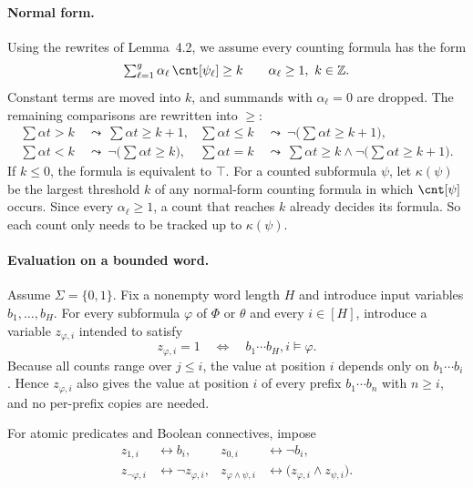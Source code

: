 \paragraph{Normal form.}
Using the rewrites of Lemma~4.2, we assume every counting formula has the form
\[
  \textstyle\sum_{\ell=1}^{g}\alpha_\ell\,\cnt[\psi_\ell] \geq k
  \qquad \alpha_\ell\geq 1,\ k\in\mathbb{Z}.
\]
Constant terms are moved into $k$, and summands with $\alpha_\ell=0$ are dropped. The remaining
comparisons are rewritten into $\geq$:
\begin{align*}
  \textstyle\sum\alpha t > k &\ \leadsto\ \textstyle\sum\alpha t\geq k+1, &
  \textstyle\sum\alpha t \leq k &\ \leadsto\ \lnot\bigl(\textstyle\sum\alpha t\geq k+1\bigr),\\
  \textstyle\sum\alpha t < k &\ \leadsto\ \lnot\bigl(\textstyle\sum\alpha t\geq k\bigr), &
  \textstyle\sum\alpha t = k &\ \leadsto\ \textstyle\sum\alpha t\geq k \land \lnot\bigl(\textstyle\sum\alpha t\geq k+1\bigr).
\end{align*}
If $k\leq 0$, the formula is equivalent to $\top$.
For a counted subformula $\psi$, let $\kappa(\psi)$ be the largest threshold $k$ of any normal-form
counting formula in which $\cnt[\psi]$ occurs. Since every $\alpha_\ell\geq 1$, a count that reaches
$k$ already decides its formula. So each count only needs to be tracked up to $\kappa(\psi)$.

\paragraph{Evaluation on a bounded word.}
Assume $\Sigma=\{0,1\}$. Fix a nonempty word length $H$ and introduce input variables
$b_1,\ldots,b_H$. For every subformula $\varphi$ of $\Phi$ or $\theta$ and every $i\in[H]$,
introduce a variable $z_{\varphi,i}$ intended to satisfy
\[
  z_{\varphi,i}=1 \quad\Longleftrightarrow\quad b_1\cdots b_H,i\models\varphi.
\]
Because all counts range over $j\leq i$, the value at position $i$ depends only on
$b_1\cdots b_i$. Hence $z_{\varphi,i}$ also gives the value at position $i$ of every prefix
$b_1\cdots b_n$ with $n\geq i$, and no per-prefix copies are needed.

For atomic predicates and Boolean connectives, impose
\begin{align*}
  z_{1,i}&\leftrightarrow b_i, &
  z_{0,i}&\leftrightarrow \lnot b_i,\\
  z_{\lnot\varphi,i}&\leftrightarrow \lnot z_{\varphi,i}, &
  z_{\varphi\land\psi,i}&\leftrightarrow \bigl(z_{\varphi,i}\land z_{\psi,i}\bigr).
\end{align*}

